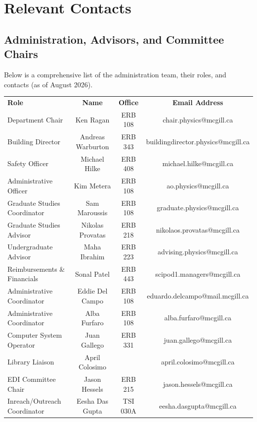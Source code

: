 \section{Relevant Contacts} \label{contacts}

\subsection*{Administration, Advisors, and Committee Chairs}
Below is a comprehensive list of the administration team, their roles, and contacts (as of August 2026).

\vspace{-5 pt}
    \begin{table}[h!]
        \hspace*{-1.5cm}
    \centering
    \renewcommand{\arraystretch}{1.2}
    \begin{tabular}{|>{\columncolor{ocre!20}}lc>{\columncolor{ocre!20}}cc|}
    \hline
    \rowcolor{ocre!60}
  {\color{white}\large\sffamily \textbf{Role}} & {\color{white}\large\sffamily \textbf{Name}}  & {\color{white}\large\sffamily \textbf{Office}}  & {\color{white}\large\sffamily \textbf{Email Address}} \\
        Department Chair & Ken Ragan & ERB 108 & chair.physics@mcgill.ca\\
        Building Director & Andreas Warburton & ERB 343 & buildingdirector.physics@mcgill.ca \\
        Safety Officer & Michael Hilke & ERB 408 & michael.hilke@mcgill.ca \\
        Administrative Officer & Kim Metera & ERB 108 & ao.physics@mcgill.ca \\
        Graduate Studies Coordinator & Sam Maroussis & ERB 108 & graduate.physics@mcgill.ca \\
        Graduate Studies Advisor & Nikolas Provatas & ERB 218 & nikolaos.provatas@mcgill.ca \\
        Undergraduate Advisor & Maha Ibrahim & ERB 223 & advising.physics@mcgill.ca \\
        Reimbursements \& Financials & Sonal Patel & ERB 443 & scipod1.managers@mcgill.ca \\
        Administrative Coordinator & Eddie Del Campo & ERB 108 & eduardo.delcampo@mail.mcgill.ca \\
        Administrative Coordinator & Alba Furfaro & ERB 108 & alba.furfaro@mcgill.ca \\
        Computer System Operator & Juan Gallego & ERB 331 & juan.gallego@mcgill.ca \\
        Library Liaison & April Colosimo & & april.colosimo@mcgill.ca \\
        EDI Committee Chair & Jason Hessels & ERB 215 & jason.hessels@mcgill.ca \\
        Inreach/Outreach Coordinator & Eesha Das Gupta & TSI 030A & eesha.dasgupta@mcgill.ca \\
        \hline
\end{tabular}
\end{table}

